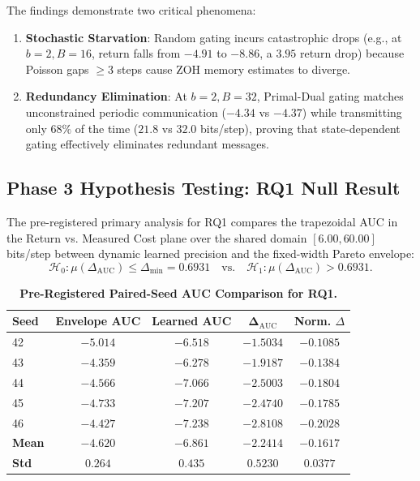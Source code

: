 \documentclass[10pt,twocolumn,letterpaper]{article}
\begin{document}
The findings demonstrate two critical phenomena:
\begin{enumerate}
    \item \textbf{Stochastic Starvation}: Random gating incurs catastrophic drops (e.g., at $b=2, B=16$, return falls from $-4.91$ to $-8.86$, a $3.95$ return drop) because Poisson gaps $\ge 3$ steps cause ZOH memory estimates to diverge.
    \item \textbf{Redundancy Elimination}: At $b=2, B=32$, Primal-Dual gating matches unconstrained periodic communication ($-4.34$ vs $-4.37$) while transmitting only $68\%$ of the time ($21.8$ vs $32.0$ bits/step), proving that state-dependent gating effectively eliminates redundant messages.
\end{enumerate}

\subsection{Phase 3 Hypothesis Testing: RQ1 Null Result}
The pre-registered primary analysis for RQ1 compares the trapezoidal AUC in the Return vs. Measured Cost plane over the shared domain $[6.00, 60.00]$ bits/step between dynamic learned precision and the fixed-width Pareto envelope:
\begin{equation}
    \mathcal{H}_0: \mu(\Delta_{\mathrm{AUC}}) \le \Delta_{\min} = 0.6931 \quad \text{vs.} \quad \mathcal{H}_1: \mu(\Delta_{\mathrm{AUC}}) > 0.6931.
\end{equation}

\begin{table}[h]
\centering
\small
\caption{\textbf{Pre-Registered Paired-Seed AUC Comparison for RQ1.}}
\label{tab:auc_table}
\begin{tabular}{lcccc}
\toprule
\textbf{Seed} & \textbf{Envelope AUC} & \textbf{Learned AUC} & $\mathbf{\Delta_{\mathrm{AUC}}}$ & \textbf{Norm. $\Delta$} \\
\midrule
42 & $-5.014$ & $-6.518$ & $-1.5034$ & $-0.1085$ \\
43 & $-4.359$ & $-6.278$ & $-1.9187$ & $-0.1384$ \\
44 & $-4.566$ & $-7.066$ & $-2.5003$ & $-0.1804$ \\
45 & $-4.733$ & $-7.207$ & $-2.4740$ & $-0.1785$ \\
46 & $-4.427$ & $-7.238$ & $-2.8108$ & $-0.2028$ \\
\midrule
\textbf{Mean} & $\mathbf{-4.620}$ & $\mathbf{-6.861}$ & $\mathbf{-2.2414}$ & $\mathbf{-0.1617}$ \\
\textbf{Std} & $0.264$ & $0.435$ & $0.5230$ & $0.0377$ \\
\bottomrule
\end{tabular}
\end{table}
\end{document}
